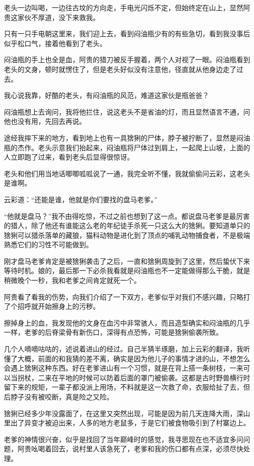 老头一边叫喝，一边往古坟的方向走，手电光闪烁不定，但始终定在山上，显然阿贵这家伙不厚道，没下来救我。

只有一只手电朝这里来，我们迎上去，看到闷油瓶少有的有些急切，看到我没事后似乎松口气，接着他看到了老头。

闷油瓶的手上也全是血，阿贵的猎刀被反手握着，两个人对视了一眼。闷油瓶看到老头的文身，顿时就愣住了，但是老头好似没有注意他，径直就从他身边走了过去。

我心说我靠，好酷的老头，有闷油瓶的风范，难道这家伙是瓶爸爸？

闷油瓶想上去询问，我将他拦住，说这老头不是省油的灯，而且显然语言不通，问他也没有用，先回去再说。

途经我摔下来的地方，看到地上也有一具猞猁的尸体，脖子被拧断了，显然是闷油瓶的杰作。老头示意我们抬起来，闷油瓶将尸体过到肩上，一起爬上山坡，上面的人立即跑了过来，看到老头后显得很惊讶。

老头和他们用当地话唧唧呱呱说了一通，我完全听不懂，我就偷偷问云彩，这老头是谁啊。

云彩道：“还能是谁，他就是你们要找的盘马老爹。”

“他就是盘马？”我不由得吃惊，不过之前也想到了这一点。都说盘马老爹是最厉害的猎人，除了他还有谁能这么老的年纪徒手杀死一只这么大的猞猁。要知道单只的猞猁可以猎杀落单的藏狼，猫科动物是进化到了顶点的哺乳动物捕食者，不是极端熟悉它们的习性不可能做到。

刚才盘马老爹肯定是被猞猁袭击了之后，一直和猞猁周旋到了这里，然后蛰伏下来等待时机。娘的，最后那一下必杀我看就是闷油瓶也不一定能做得那么干脆，就是稍微晚个一秒，我和老爹之间肯定就死一个。

阿贵看了看我的伤势，向我们介绍了一下双方，老爹似乎对我们不感兴趣，只略打了个招呼就开始擦身上的污秽。

擦掉身上的血，我发现他的文身在血污中非常骇人，而且造型确实和闷油瓶的几乎一样，老爹的后脊梁骨有新伤口，深得有点恐怖，可能是猞猁偷袭所致。

几个人嘀嘀咕咕的，述说着进山的经过。自己半猜半琢磨，加上云彩的翻译，我听懂了大概，前面的和我猜的差不离，确实是因为他儿子的事情才进的山，不想怎么会遇上猞猁这种东西。好在老爹进山有一个习惯，就是在背上搭一条树枝，一来可以当拐杖，二来在平地的时候可以防着后面的罩门被偷袭。这都是古时野兽横行时留下来的规矩，一辈子都没派上用场，不料就是这一次救了命，衣服给扯了去，但后脖子没有被咬断，真是险之又险。

猞猁已经多少年没露面了，在这里又突然出现，可能是因为前几天连降大雨，深山里出了异变才被迫出来，人多的地方老鼠多，于是它们被食物吸引到了村寨边上。

老爹的神情很兴奋，似乎是找回了当年巅峰时的感觉，我寻思现在也不适宜多问问题，阿贵吆喝着回去，说村里人该急死了，老爹和我的伤口都有点深，必须尽快处理。

